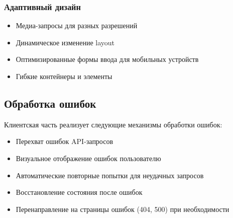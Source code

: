 \subsubsection{Адаптивный дизайн}

\begin{itemize}
	\item Медиа-запросы для разных разрешений
	\item Динамическое изменение layout
	\item Оптимизированные формы ввода для мобильных устройств
	\item Гибкие контейнеры и элементы
\end{itemize}

\subsection{Обработка ошибок}

Клиентская часть реализует следующие механизмы обработки ошибок:

\begin{itemize}
	\item Перехват ошибок API-запросов
	\item Визуальное отображение ошибок пользователю
	\item Автоматические повторные попытки для неудачных запросов
	\item Восстановление состояния после ошибок
	\item Перенаправление на страницы ошибок (404, 500) при необходимости
\end{itemize}

